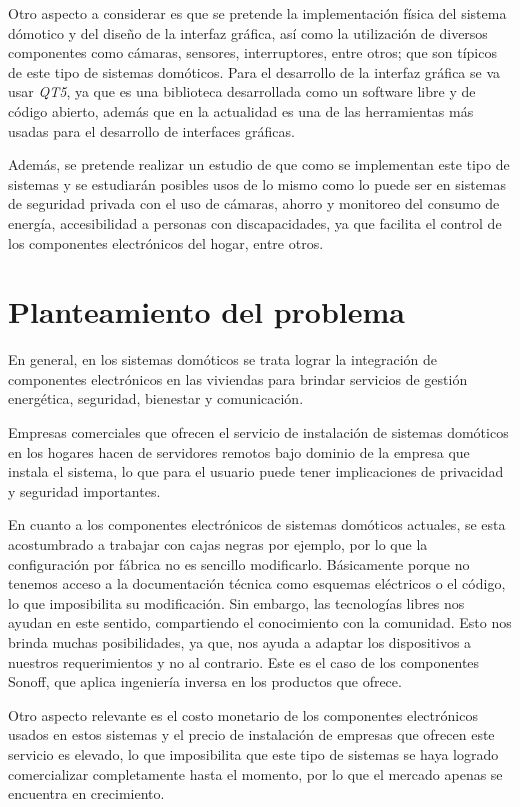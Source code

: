 Otro aspecto a considerar es que se pretende la implementación física del sistema dómotico y del diseño de la interfaz gráfica, así como la utilización de diversos componentes como cámaras, sensores, interruptores, entre otros; que son típicos de este tipo de sistemas domóticos. Para el desarrollo de la interfaz gráfica se va usar \textit{QT5}, ya que es una biblioteca desarrollada como un software libre y de código abierto, además que en la actualidad es una de las herramientas más usadas para el desarrollo de interfaces gráficas.

Además, se pretende realizar un estudio de que como se implementan este tipo de sistemas y se estudiarán posibles usos de lo mismo como lo puede ser en sistemas de seguridad privada con el uso de cámaras, ahorro y monitoreo del consumo de energía, accesibilidad a personas con discapacidades, ya que facilita el control de los componentes electrónicos del hogar, entre otros.


\section{Planteamiento del problema}

En general, en los sistemas domóticos se trata lograr la integración de componentes electrónicos en las viviendas para brindar servicios de gestión energética, seguridad, bienestar y comunicación.

Empresas comerciales que ofrecen el servicio de instalación de sistemas domóticos en los hogares hacen de servidores remotos bajo dominio de la empresa que instala el sistema, lo que para el usuario puede tener implicaciones de privacidad y seguridad importantes.

En cuanto a los componentes electrónicos de sistemas domóticos actuales, se esta acostumbrado a trabajar con cajas negras por ejemplo, por lo que la configuración por fábrica no es sencillo modificarlo. Básicamente porque no tenemos acceso a la documentación técnica como esquemas eléctricos o el código, lo que imposibilita su modificación. Sin embargo, las tecnologías libres nos ayudan en este sentido, compartiendo el conocimiento con la comunidad. Esto nos brinda muchas posibilidades, ya que, nos ayuda a adaptar los dispositivos a nuestros requerimientos y no al contrario. Este es el caso de los componentes Sonoff, que aplica ingeniería inversa en los productos que ofrece. 

Otro aspecto relevante es el costo monetario de los componentes electrónicos usados en estos sistemas y el precio de instalación de empresas que ofrecen este servicio es elevado, lo que imposibilita que este tipo de sistemas se haya logrado comercializar completamente hasta el momento, por lo que el mercado apenas se encuentra en crecimiento.

